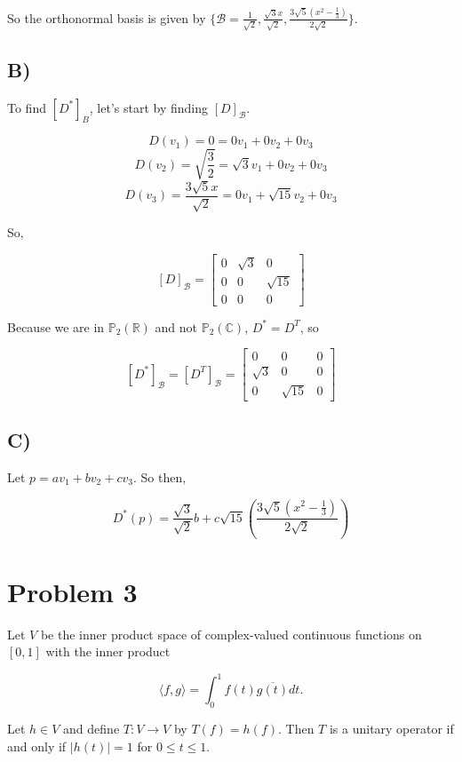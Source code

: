 \documentclass[12pt, letterpaper]{article}
\begin{document}
So the orthonormal basis is given by $ \{ \mathcal{B} = \frac{1}{\sqrt{2}}, \frac{\sqrt{3}x}{\sqrt{2}}, \frac{3\sqrt{5}(x^2 - \frac{1}{3})}{2\sqrt{2}} \}$. 

\subsection*{B)}
To find $[D^*]_B$, let's start by finding $[D]_{\mathcal{B}}$.

\[ D(v_1) = 0 = 0v_1 + 0v_2 + 0v_3 \]
\[ D(v_2) = \sqrt{\frac{3}{2}} = \sqrt{3}v_1 + 0v_2 + 0v_3 \]
\[ D(v_3) = \frac{3\sqrt{5}x}{\sqrt{2}} = 0v_1 + \sqrt{15}v_2 + 0v_3 \]

So,

\[ [D]_\mathcal{B} = \begin{bmatrix} 0 & \sqrt{3} & 0 \\ 0 & 0 & \sqrt{15} \\ 0 & 0 & 0 \end{bmatrix} \]

Because we are in $\mathbb{P}_2(\mathbb{R})$ and not $\mathbb{P}_2(\mathbb{C})$, $D^* = D^T$, so

\[ [D^*]_\mathcal{B} = [D^T]_\mathcal{B} = \begin{bmatrix} 0 & 0 & 0 \\ \sqrt{3} & 0 & 0 \\ 0 & \sqrt{15} & 0 \end{bmatrix} \]

\subsection*{C)}
Let $p = av_1 + bv_2 + cv_3$. So then,

\[ D^*(p) = \frac{\sqrt{3}}{\sqrt{2}}b + c\sqrt{15}\left(\frac{3\sqrt{5}(x^2 - \frac{1}{3})}{2\sqrt{2}} \right) \]

\section*{Problem 3}
Let $V$ be the inner product space of complex-valued continuous functions on $[0, 1]$ with the inner product

\[ \langle f, g \rangle = \int^1_0f(t)\overline{g(t)}dt. \]

Let $h \in V$ and define $T: V \rightarrow V$ by $T(f) = h(f)$. Then $T$ is a unitary operator if and only if $|h(t)| = 1$ for $0 \le t \le 1$. 
\end{document}
